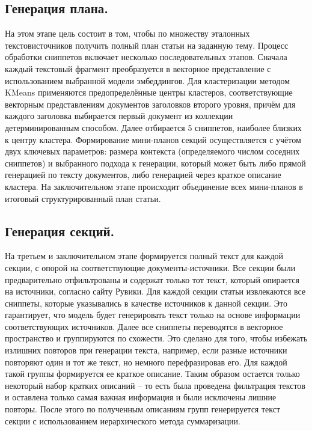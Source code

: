\documentclass{article}
\theoremstyle{definition}
\theoremstyle{plain}
\begin{document}
\subsection*{Генерация плана.}

На этом этапе цель состоит в том, чтобы по множеству эталонных текстов\-источников получить полный план статьи на заданную тему.
Процесс обработки сниппетов включает несколько последовательных этапов. 
Сначала каждый текстовый фрагмент преобразуется в векторное представление с использованием выбранной модели эмбеддингов. 
Для кластеризации методом KMeans применяются предопределённые центры кластеров, соответствующие векторным представлениям документов заголовков второго уровня, причём для каждого заголовка выбирается первый документ из коллекции детерминированным способом. 
Далее отбирается 5 сниппетов, наиболее близких к центру кластера.  Формирование мини-планов секций осуществляется с учётом двух ключевых параметров: размера контекста (определяемого числом соседних сниппетов) и выбранного подхода к генерации, который может быть либо прямой генерацией по тексту документов, либо генерацией через краткое описание кластера. 
На заключительном этапе происходит объединение всех мини-планов в итоговый структурированный план статьи.

\subsection*{Генерация секций.}
На третьем и заключительном этапе формируется полный текст для каждой секции, с опорой на соответствующие документы-источники.
Все секции были предварительно отфильтрованы и содержат только тот текст, который опирается на источники, согласно сайту Рувики. 
Для каждой секции статьи извлекаются все сниппеты, которые указывались в качестве источников к данной секции. 
Это гарантирует, что модель будет генерировать текст только на основе информации соответствующих источников.  Далее все сниппеты переводятся в векторное пространство и группируются по схожести. 
Это сделано для того, чтобы избежать излишних повторов при генерации текста, например, если разные источники повторяют один и тот же текст, но немного перефразировав его. 
Для каждой такой группы формируется ее краткое описание.
Таким образом остается только некоторый набор кратких описаний – то есть была проведена фильтрация текстов и оставлена только самая важная информация и были исключены лишние повторы. 
После этого по полученным описаниям групп генерируется текст секции с использованием иерархического метода суммаризации.
\end{document}
